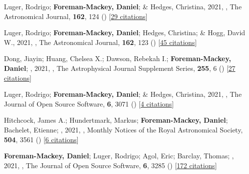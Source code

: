 \item[{\color{numcolor}\scriptsize71}] Luger, Rodrigo; \textbf{Foreman-Mackey, Daniel}; \& Hedges, Christina, 2021, , The Astronomical Journal, \textbf{162}, 124 () [\href{https://ui.adsabs.harvard.edu/abs/2021AJ....162..124L}{29 citations}]

\item[{\color{numcolor}\scriptsize70}] Luger, Rodrigo; \textbf{Foreman-Mackey, Daniel}; Hedges, Christina; \& Hogg, David W., 2021, , The Astronomical Journal, \textbf{162}, 123 () [\href{https://ui.adsabs.harvard.edu/abs/2021AJ....162..123L}{45 citations}]

\item[{\color{numcolor}\scriptsize69}] Dong, Jiayin; Huang, Chelsea X.; Dawson, Rebekah I.; \textbf{Foreman-Mackey, Daniel}; \etal, 2021, , The Astrophysical Journal Supplement Series, \textbf{255}, 6 () [\href{https://ui.adsabs.harvard.edu/abs/2021ApJS..255....6D}{27 citations}]

\item[{\color{numcolor}\scriptsize68}] Luger, Rodrigo; \textbf{Foreman-Mackey, Daniel}; \& Hedges, Christina, 2021, , The Journal of Open Source Software, \textbf{6}, 3071 () [\href{https://ui.adsabs.harvard.edu/abs/2021JOSS....6.3071L}{4 citations}]

\item[{\color{numcolor}\scriptsize67}] Hitchcock, James A.; Hundertmark, Markus; \textbf{Foreman-Mackey, Daniel}; Bachelet, Etienne; \etal, 2021, , Monthly Notices of the Royal Astronomical Society, \textbf{504}, 3561 () [\href{https://ui.adsabs.harvard.edu/abs/2021MNRAS.504.3561H}{6 citations}]

\item[{\color{numcolor}\scriptsize66}] \textbf{Foreman-Mackey, Daniel}; Luger, Rodrigo; Agol, Eric; Barclay, Thomas; \etal, 2021, , The Journal of Open Source Software, \textbf{6}, 3285 () [\href{https://ui.adsabs.harvard.edu/abs/2021JOSS....6.3285F}{172 citations}]


